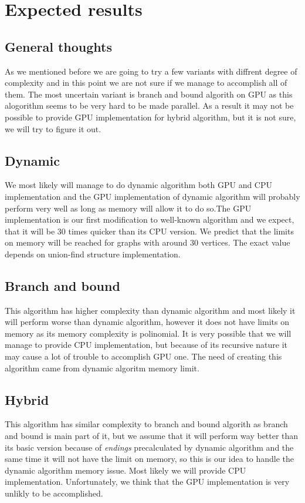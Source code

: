 \section{Expected results}
\subsection{General thoughts}
As we mentioned before we are going to try a few variants with diffrent degree of complexity and in this point we are not sure if we manage to accomplish all of them. The most uncertain variant is branch and bound algorith on GPU as this alogorithm seems to be very hard to be made parallel. As a result it may not be possible to provide  GPU implementation for hybrid algorithm, but it is not sure, we will try to figure it out.\\
\subsection{Dynamic}
We most likely will manage to do dynamic algorithm both GPU and CPU implementation and the GPU implementation of dynamic algorithm will probably perform very well as long as memory will allow it to do so.The GPU implementation is our first modification to well-known algorithm and we expect, that it will be 30 times quicker than its CPU version. We predict that the limits on memory will be reached for graphs with around 30 vertices. The exact value depends on union-find structure implementation.\\

\subsection{Branch and bound}
This algorithm has higher complexity than dynamic algorithm and most likely it will perform worse than dynamic algorithm, however it does not have limits on memory as its memory complexity is polinomial. It is very possible that we will manage to provide CPU implementation, but because of its recursive nature it may cause a lot of trouble to accomplish GPU one. The need of creating this algorithm came from dynamic algoritm memory limit.\\


\subsection{Hybrid}
This algorithm has similar complexity to branch and bound algorith as branch and bound is main part of it, but we assume that it will perform way better than its basic version because of \emph{endings} precalculated by dynamic algorithm and the same time it will not have the limit on memory, so this is our idea to handle the dynamic algorithm memory issue. Most likely we will provide CPU implementation. Unfortunately, we think that the GPU implementation is very unlikly to be accomplished.
